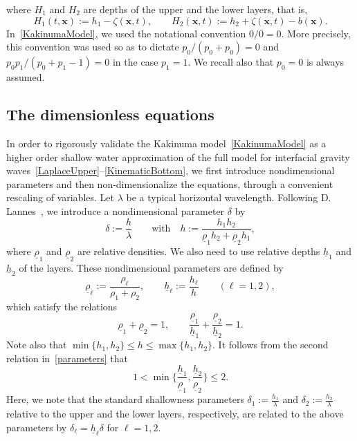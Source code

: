 \documentclass[11pt,leqno]{article}
\numberwithin{equation}{section}
\numberwithin{figure}{section}
\begin{document}
%
where $H_1$ and $H_2$ are depths of the upper and the lower layers, that is, 
%
\[
H_1(t,\bm{x}) := h_1 - \zeta(\bm{x},t), \qquad H_2(\bm{x},t) := h_2 + \zeta(\bm{x},t) - b(\bm{x}).
\]
%
In~\eqref{KakinumaModel}, we used the notational convention $0/0 = 0$. 
More precisely, this convention was used so as to dictate $p_0/(p_0+p_0)=0$ and $p_0p_1/(p_0+p_1-1)=0$ in the case $p_1=1$. 
We recall also that $p_0=0$ is always assumed.


\subsection{The dimensionless equations}
%
In order to rigorously validate the Kakinuma model~\eqref{KakinumaModel} as a higher order shallow water approximation 
of the full model for interfacial gravity waves~\eqref{LaplaceUpper}--\eqref{KinematicBottom}, 
we first introduce nondimensional parameters and then non-dimensionalize the equations, through a convenient rescaling of variables. 
Let $\lambda$ be a typical horizontal wavelength. 
Following D. Lannes~\cite{Lannes2013}, we introduce a nondimensional parameter $\delta$ by 
%
\[
\delta := \frac{h}{\lambda} \qquad\mbox{with}\quad h:=\frac{h_1h_2}{\underline{\rho}_1h_2+\underline{\rho}_2h_1},
\]
%
where $\underline{\rho}_1$ and $\underline{\rho}_2$ are relative densities. 
We also need to use relative depths $\underline{h}_1$ and $\underline{h}_2$ of the layers. 
These nondimensional parameters are defined by 
%
\[
\underline{\rho}_\ell:=\frac{\rho_\ell}{\rho_1+\rho_2}, \qquad
\underline{h}_\ell:=\frac{h_\ell}{h} \qquad (\ell=1,2),
\]
%
which satisfy the relations 
%
\begin{equation}\label{parameters}
\underline{\rho}_1+\underline{\rho}_2=1, \qquad 
\frac{\underline{\rho}_1}{\underline{h}_1}+\frac{\underline{\rho}_2}{\underline{h}_2}=1.
\end{equation}
%
Note also that $\min\{h_1,h_2\} \leq h \leq \max\{h_1,h_2\}$. 
It follows from the second relation in~\eqref{parameters} that 
%
\begin{equation}\label{parameter-relation}
1 < \min\biggl\{ \frac{\underline{h}_1}{\underline{\rho}_1}, \frac{\underline{h}_2}{\underline{\rho}_2} \biggr\} \leq 2.
\end{equation}
%
Here, we note that the standard shallowness parameters $\delta_1:=\frac{h_1}{\lambda}$ and $\delta_2:=\frac{h_2}{\lambda}$ 
relative to the upper and the lower layers, respectively, are related to the above parameters by 
$\delta_\ell = \underline{h}_\ell\delta$ for $\ell=1,2$. 
\end{document}
